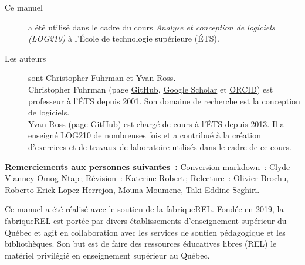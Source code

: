 \small
\begin{description}
\item[Ce manuel]a été utilisé dans le cadre du cours \emph{Analyse et
conception de logiciels (LOG210)} à l'École de technologie supérieure
(ÉTS).\\
\item[Les auteurs]sont Christopher Fuhrman et Yvan Ross.\\
Christopher Fuhrman (page \href{https://github.com/fuhrmanator}{GitHub}, \href{https://scholar.google.com/citations?user=Qa5SpUwAAAAJ\&hl=fr\&oi=ao}{Google Scholar} et \href{https://orcid.org/0000-0001-8010-1087}{ORCID}) est professeur à l'ÉTS depuis 2001.
Son domaine de recherche est la conception de logiciels.\\
Yvan Ross (page \href{https://github.com/yvanross}{GitHub}) est chargé de cours à l'ÉTS depuis 2013. Il a enseigné LOG210 de nombreuses fois et a contribué à la création d'exercices et de travaux de laboratoire utilisés dans le cadre de ce cours.
\end{description}

\textbf{Remerciements aux personnes suivantes~:} Conversion markdown~: Clyde Vianney Omog Ntap\,; Révision~: Katerine Robert\,; Relecture~: Olivier Brochu, Roberto Erick Lopez-Herrejon, Mouna Moumene, Taki Eddine Seghiri. 


Ce manuel a été réalisé avec le soutien de la
fabriqueREL. Fondée en 2019, la fabriqueREL est
portée par divers établissements d’enseignement
supérieur du Québec et agit en collaboration avec
les services de soutien pédagogique et les
bibliothèques. Son but est de faire des ressources
éducatives libres (REL) le matériel privilégié en
enseignement supérieur au Québec.

